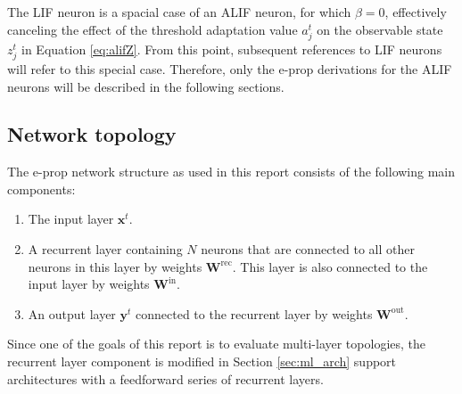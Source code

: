             The LIF neuron is a spacial case of an ALIF neuron, for which $\beta=0$, effectively canceling the effect of the threshold adaptation value $a^t_j$ on the observable state $z^t_j$ in Equation \ref{eq:alifZ}.
            From this point, subsequent references to LIF neurons will refer to this special case.
            Therefore, only the e-prop derivations for the ALIF neurons will be described in the following sections.

    \subsection{Network topology}
        The e-prop network structure as used in this report consists of the following main components:
        \begin{enumerate}
            \item The input layer $\mathbf{x}^t$.
            \item A recurrent layer containing $N$ neurons that are connected to all other neurons in this layer by weights $\mathbf{W}^\text{rec}$. This layer is also connected to the input layer by weights $\mathbf{W}^\text{in}$.
            \item An output layer $\mathbf{y}^t$ connected to the recurrent layer by weights $\mathbf{W}^\text{out}$.
        \end{enumerate}

        Since one of the goals of this report is to evaluate multi-layer topologies, the recurrent layer component is modified in Section \ref{sec:ml_arch} support architectures with a feedforward series of recurrent layers.


